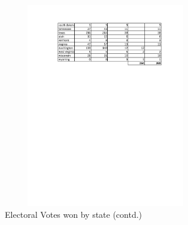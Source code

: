 \documentclass{sig-alternate-05-2015}
\begin{document}
\begin{figure}
\centering
\includegraphics[width=3.5in, height=3.5in]{WinnerCalculation2.pdf}
\caption{Electoral Votes won by state (contd.)}
\label{WinnerCalculation}
\end{figure}
\end{document}
